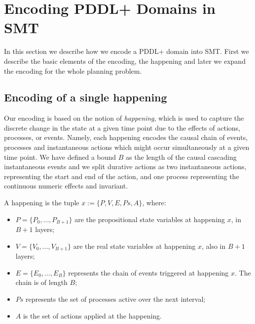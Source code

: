 \section{Encoding PDDL+ Domains in SMT}\label{sec:enc}

In this section we describe how we encode a PDDL+ domain into SMT. First we describe the basic elements of the encoding, the happening and later we expand the encoding for the whole planning problem.

\subsection{Encoding of a single happening}\label{sec:enc_happening}

Our encoding is based on the notion of \textit{happening}, which is used to capture the discrete change in the state at a given time point due to the effects of actions, processes, or events. Namely, each happening encodes the causal chain of events, processes and instantaneous actions which might occur simultaneously at a given time point. We have defined a bound $B$ as the length of the causal cascading instantaneous events and we split durative actions as two instantaneous actions, representing the start and end of the action, and one process representing the continuous numeric effects and invariant.

\begin{definition}[Happening]
A happening is the tuple $x := \{P, V, E, Ps, A \}$, where:
\begin{itemize}

\item ${P}=\{P_{0},\ldots,P_{B+1}\}$ are the propositional state variables at happening $x$, in $B+1$ layers;

\item ${V}=\{V_{0},\ldots, V_{B+1}\}$ are the real state variables at happening $x$, also in $B+1$ layers;

\item ${E}=\{E_{0},\ldots,E_{B}\}$ represents the chain of events triggered at happening $x$. The chain is of length $B$;

\item ${Ps}$ represents the set of processes active over the next interval;

\item ${A}$ is the set of actions applied at the happening.
\end{itemize}
\label{def:happening}
\end{definition}
 

